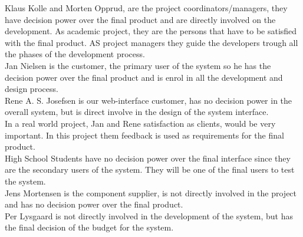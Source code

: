 Klaus Kolle and Morten Opprud, are the project coordinators/managers, they
have decision power over the final product and are directly involved on the
development. As academic project, they are the persons that have to be satisfied with the final product. AS project managers they guide the developers trough all the phases of the development process.\\

Jan Nielsen is the customer, the primary user of the system so he has the
decision power over the final product and is enrol in all the development and design process. \\

Rene A. S. Josefsen is our web-interface customer, has no decision power in the
overall system, but is direct involve in the design of the system interface.\\

In a real world project,  Jan and Rene satisfaction as clients, would be very important. In this project them feedback is used as requirements for the final product.\\ 

High School Students have no decision power over the final interface since they
are the secondary users of the system. They will be one of the final users to test the system.\\

Jens Mortensen is the component supplier, is not directly involved in the
project and has no decision power over the final product.\\

Per Lysgaard is not directly involved in the development of the system, but has the final decision of the budget for the system.\\


